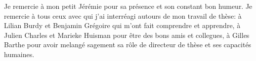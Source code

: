


Je remercie \`a mon petit J\'er\'emie pour sa
pr\'esence et son constant bon humeur.
Je remercie \`a tous ceux avec qui j'ai 
 interr\'eagi autours de mon travail de th\`ese:  
  \`a Lilian Burdy et Benjamin Gr\'egoire  qui m'ont fait comprendre et apprendre,
\`a Julien Charles et Marieke Huisman pour \^etre des bons amis et collegues, 
\`a Gilles Barthe pour avoir melang\'e sagement sa r\^ole de 
directeur de th\`ese et ses capacit\'es humaines. 

 
